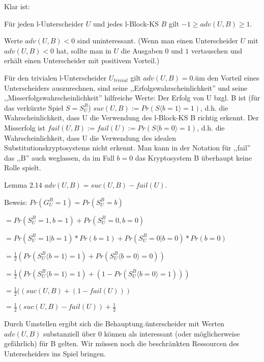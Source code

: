 \documentclass[a4paper]{article}
\begin{document}
\begin{multicols}{3}
    Klar ist:
    \begin{itemize*}
        \item Für jeden l-Unterscheider $U$ und jedes l-Block-KS $B$ gilt $-1\geq adv(U,B)\geq 1$.
        \item Werte $adv(U,B)<0$ sind uninteressant. (Wenn man einen Unterscheider $U$ mit $adv(U,B)<0$ hat, sollte man in $U$ die Ausgaben $0$ und $1$ vertauschen und erhält einen Unterscheider mit positivem Vorteil.)
        \item Für den trivialen l-Unterscheider $U_{trivial}$ gilt $adv(U,B) = 0$.üm den Vorteil eines Unterscheiders auszurechnen, sind seine ,,Erfolgswahrscheinlichkeit'' und seine ,,Misserfolgswahrscheinlichkeit'' hilfreiche Werte: Der Erfolg von U bzgl. B ist (für das verkürzte Spiel $S=S_U^B$) $suc(U,B) := Pr(S\langle b= 1\rangle = 1)$, d.h. die Wahrscheinlichkeit, dass U die Verwendung des l-Block-KS B richtig erkennt. Der Misserfolg ist $fail(U,B) := fail(U) := Pr(S\langle b= 0\rangle = 1)$, d.h. die Wahrscheinlichkeit, dass U die Verwendung des idealen Substitutionskryptosystems nicht erkennt. Man kann in der Notation für ,,fail'' das ,,B'' auch weglassen, da im Fall $b=0$ das Kryptosystem B überhaupt keine Rolle spielt.
    \end{itemize*}

    Lemma 2.14 $adv(U,B) = suc(U,B)-fail(U)$.

    Beweis: $Pr(G^B_U= 1) = Pr(S_U^B=b)$
    \begin{itemize*}
        \item $= Pr(S_U^B= 1,b= 1) + Pr(S_U^B= 0,b= 0)$
        \item $= Pr(S_U^B= 1|b= 1)* Pr(b= 1) + Pr(S^B_U= 0|b= 0)*Pr(b= 0)$
        \item $=\frac{1}{2}( Pr(S_U^B\langle b= 1\rangle = 1) + Pr(S_U^B\langle b= 0\rangle = 0))$
        \item $=\frac{1}{2}( Pr(S_U^B\langle b= 1\rangle = 1) + (1-Pr(S_U^B\langle b= 0\rangle = 1)))$
        \item $=\frac{1}{2}( (suc(U,B) + (1-fail(U)))$
        \item $=\frac{1}{2}(suc(U,B)-fail(U)) + \frac{1}{2}$
    \end{itemize*}

    Durch Umstellen ergibt sich die Behauptung.ünterscheider mit Werten $adv(U,B)$ substanziell über 0 können als interessant (oder möglicherweise gefährlich) für B gelten. Wir müssen noch die beschränkten Ressourcen des Unterscheiders ins Spiel bringen.


\end{multicols}
\end{document}

